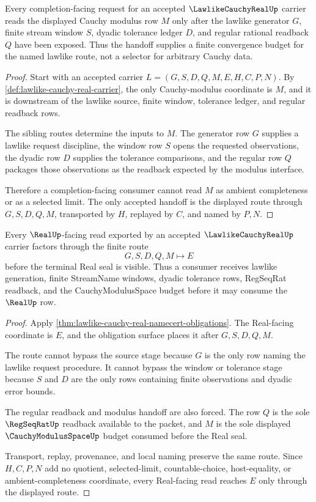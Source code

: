 \begin{theorem}
\label{thm:lawlike-cauchy-real-modulus-handoff}
Every completion-facing request for an accepted $\LawlikeCauchyRealUp$ carrier reads the displayed Cauchy modulus row $M$ only after the lawlike generator $G$, finite stream window $S$, dyadic tolerance ledger $D$, and regular rational readback $Q$ have been exposed. Thus the handoff supplies a finite convergence budget for the named lawlike route, not a selector for arbitrary Cauchy data.
\end{theorem}
\begin{proof}
Start with an accepted carrier $L=(G,S,D,Q,M,E,H,C,P,N)$. By \autoref{def:lawlike-cauchy-real-carrier}, the only Cauchy-modulus coordinate is $M$, and it is downstream of the lawlike source, finite window, tolerance ledger, and regular readback rows.

The sibling routes determine the inputs to $M$. The generator row $G$ supplies a lawlike request discipline, the window row $S$ opens the requested observations, the dyadic row $D$ supplies the tolerance comparisons, and the regular row $Q$ packages those observations as the readback expected by the modulus interface.

Therefore a completion-facing consumer cannot read $M$ as ambient completeness or as a selected limit. The only accepted handoff is the displayed route through $G,S,D,Q,M$, transported by $H$, replayed by $C$, and named by $P,N$.
\end{proof}

\begin{theorem}
\label{thm:lawlike-cauchy-real-real-seal}
Every $\RealUp$-facing read exported by an accepted $\LawlikeCauchyRealUp$ carrier factors through the finite route
$$
G,S,D,Q,M \longmapsto E
$$
before the terminal Real seal is visible. Thus a consumer receives lawlike generation, finite StreamName windows, dyadic tolerance rows, RegSeqRat readback, and the CauchyModulusSpace budget before it may consume the $\RealUp$ row.
\end{theorem}
\begin{proof}
Apply \autoref{thm:lawlike-cauchy-real-namecert-obligations}. The Real-facing coordinate is $E$, and the obligation surface places it after $G,S,D,Q,M$.

The route cannot bypass the source stage because $G$ is the only row naming the lawlike request procedure. It cannot bypass the window or tolerance stage because $S$ and $D$ are the only rows containing finite observations and dyadic error bounds.

The regular readback and modulus handoff are also forced. The row $Q$ is the sole $\RegSeqRatUp$ readback available to the packet, and $M$ is the sole displayed $\CauchyModulusSpaceUp$ budget consumed before the Real seal.

Transport, replay, provenance, and local naming preserve the same route. Since $H,C,P,N$ add no quotient, selected-limit, countable-choice, host-equality, or ambient-completeness coordinate, every Real-facing read reaches $E$ only through the displayed route.
\end{proof}

